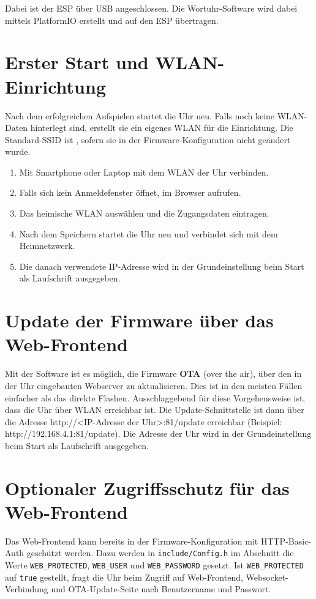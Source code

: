 \documentclass[12pt,a4paper, german,oneside, headinclude, headsepline,plainheadsepline,BCOR20mm, DIV18,parskip=half, openright, numbers=noenddot, captions=tableheading,version=first,listof=totoc,version=first]{scrbook}
\begin{document}
Dabei ist der ESP über USB angeschlossen. Die Wortuhr-Software wird dabei mittels PlatformIO erstellt und auf den ESP übertragen.

\section{Erster Start und WLAN-Einrichtung}
Nach dem erfolgreichen Aufspielen startet die Uhr neu. Falls noch keine WLAN-Daten hinterlegt sind, erstellt sie ein eigenes WLAN für die Einrichtung. Die Standard-SSID ist , sofern sie in der Firmware-Konfiguration nicht geändert wurde.

\begin{enumerate}
    \item Mit Smartphone oder Laptop mit dem WLAN der Uhr verbinden.
    \item Falls sich kein Anmeldefenster öffnet, im Browser  aufrufen.
    \item Das heimische WLAN auswählen und die Zugangsdaten eintragen.
    \item Nach dem Speichern startet die Uhr neu und verbindet sich mit dem Heimnetzwerk.
    \item Die danach verwendete IP-Adresse wird in der Grundeinstellung beim Start als Laufschrift ausgegeben.
\end{enumerate}

\section{Update der Firmware über das Web-Frontend}
Mit der Software ist es möglich, die Firmware \textbf{OTA} (over the air), über den in der Uhr eingebauten Webserver zu aktualisieren. Dies ist in den meisten Fällen einfacher als das direkte Flashen.
Ausschlaggebend für diese Vorgehensweise ist, dass die Uhr über WLAN erreichbar ist. Die Update-Schnittstelle ist dann über die Adresse
http://<IP-Adresse der Uhr>:81/update erreichbar (Beispiel: http://192.168.4.1:81/update). Die Adresse der Uhr wird in der Grundeinstellung beim Start als Laufschrift ausgegeben.

\section{Optionaler Zugriffsschutz für das Web-Frontend}
Das Web-Frontend kann bereits in der Firmware-Konfiguration mit HTTP-Basic-Auth geschützt werden. Dazu werden in \texttt{include/Config.h} im Abschnitt  die Werte \texttt{WEB\_PROTECTED}, \texttt{WEB\_USER} und \texttt{WEB\_PASSWORD} gesetzt. Ist \texttt{WEB\_PROTECTED} auf \texttt{true} gestellt, fragt die Uhr beim Zugriff auf Web-Frontend, Websocket-Verbindung und OTA-Update-Seite nach Benutzername und Passwort.
\end{document}
